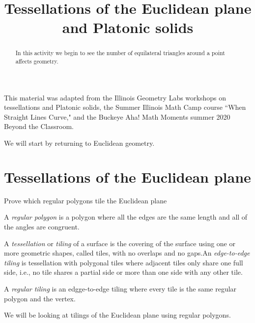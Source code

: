 \documentclass[newpage,hints,handout]{ximera}
\title{Tessellations of the Euclidean plane and Platonic solids}
\begin{document}
\begin{abstract}
In this activity we begin to see the number of equilateral triangles around a point affects geometry.
\end{abstract}
\maketitle
This material was adapted from the Illinois Geometry Labs workshops on tessellations and Platonic solids, the Summer Illinois Math Camp course ``When Straight Lines Curve," and the Buckeye Aha! Math Moments summer 2020 Beyond the Classroom.


We will start by returning to Euclidean geometry. 
\section{Tessellations of the Euclidean plane}
\begin{listOutcomes}
 \item Prove which regular polygons tile the Euclidean plane
\end{listOutcomes}
\begin{definition} 
A \emph{regular polygon }is a polygon where all the edges are the same length and all of the angles are congruent. \end{definition}

\begin{definition} A \emph{tessellation} or \emph{tiling} of a surface is the covering of the surface using one or more geometric shapes, called tiles, with no overlaps and no gaps.An \emph{edge-to-edge tiling} is tessellation with polygonal tiles where adjacent tiles only share one full side, i.e., no tile shares a partial side or more than one side with any other tile. 

A \emph{regular tiling} is an edgge-to-edge tiling where every tile is the same regular polygon and the vertex.
\end{definition}

We will be looking at tilings of the Euclidean plane using regular polygons.
\end{document}
